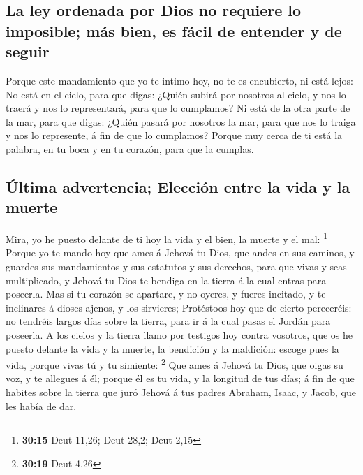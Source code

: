 \hypertarget{la-ley-ordenada-por-dios-no-requiere-lo-imposible-muxe1s-bien-es-fuxe1cil-de-entender-y-de-seguir}{%
\subsection{La ley ordenada por Dios no requiere lo imposible; más bien,
es fácil de entender y de
seguir}\label{la-ley-ordenada-por-dios-no-requiere-lo-imposible-muxe1s-bien-es-fuxe1cil-de-entender-y-de-seguir}}

 Porque este mandamiento que yo te intimo hoy, no te es
encubierto, ni está lejos:  No está en el cielo, para que
digas: ¿Quién subirá por nosotros al cielo, y nos lo traerá y nos lo
representará, para que lo cumplamos?  Ni está de la otra
parte de la mar, para que digas: ¿Quién pasará por nosotros la mar, para
que nos lo traiga y nos lo represente, á fin de que lo cumplamos?
 Porque muy cerca de ti está la palabra, en tu boca y en tu
corazón, para que la cumplas.

\hypertarget{uxfaltima-advertencia-elecciuxf3n-entre-la-vida-y-la-muerte}{%
\subsection{Última advertencia; Elección entre la vida y la
muerte}\label{uxfaltima-advertencia-elecciuxf3n-entre-la-vida-y-la-muerte}}

 Mira, yo he puesto delante de ti hoy la vida y el bien, la
muerte y el mal: \footnote{\textbf{30:15} Deut 11,26; Deut 28,2; Deut
  2,15}  Porque yo te mando hoy que ames á Jehová tu Dios,
que andes en sus caminos, y guardes sus mandamientos y sus estatutos y
sus derechos, para que vivas y seas multiplicado, y Jehová tu Dios te
bendiga en la tierra á la cual entras para poseerla.  Mas
si tu corazón se apartare, y no oyeres, y fueres incitado, y te
inclinares á dioses ajenos, y los sirvieres;  Protéstoos
hoy que de cierto pereceréis: no tendréis largos días sobre la tierra,
para ir á la cual pasas el Jordán para poseerla.  A los
cielos y la tierra llamo por testigos hoy contra vosotros, que os he
puesto delante la vida y la muerte, la bendición y la maldición: escoge
pues la vida, porque vivas tú y tu simiente: \footnote{\textbf{30:19}
  Deut 4,26}  Que ames á Jehová tu Dios, que oigas su voz,
y te allegues á él; porque él es tu vida, y la longitud de tus días; á
fin de que habites sobre la tierra que juró Jehová á tus padres Abraham,
Isaac, y Jacob, que les había de dar.

